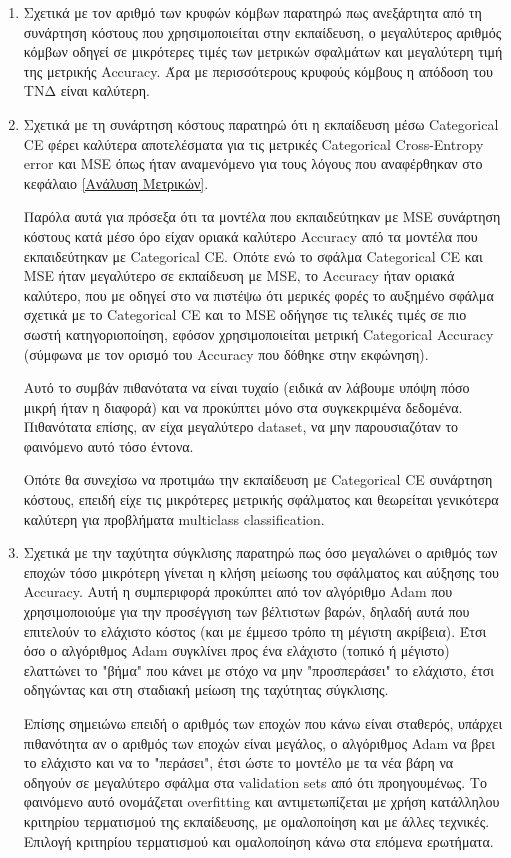 \documentclass[12pt,a4paper]{article}
\begin{document}
\begin{enumerate}
    \item Σχετικά με τον αριθμό των κρυφών κόμβων παρατηρώ πως ανεξάρτητα από τη συνάρτηση κόστους που χρησιμοποιείται στην εκπαίδευση, ο μεγαλύτερος αριθμός κόμβων οδηγεί σε μικρότερες τιμές των μετρικών σφαλμάτων και μεγαλύτερη τιμή της μετρικής Accuracy. Άρα με περισσότερους κρυφούς κόμβους η απόδοση του ΤΝΔ είναι καλύτερη.
    \item Σχετικά με τη συνάρτηση κόστους παρατηρώ ότι η εκπαίδευση μέσω Categorical CE φέρει καλύτερα αποτελέσματα για τις μετρικές Categorical Cross-Entropy error και MSE όπως ήταν αναμενόμενο για τους λόγους που αναφέρθηκαν στο κεφάλαιο \ref{Ανάλυση Μετρικών}. 

        Παρόλα αυτά για πρόσεξα ότι τα μοντέλα που εκπαιδεύτηκαν με MSE συνάρτηση κόστους κατά μέσο όρο είχαν οριακά καλύτερο Accuracy από τα μοντέλα που εκπαιδεύτηκαν με Categorical CE. Οπότε ενώ το σφάλμα Categorical CE και MSE ήταν μεγαλύτερο σε εκπαίδευση με MSE, το Accuracy ήταν οριακά καλύτερο, που με οδηγεί στο να πιστέψω ότι μερικές φορές το αυξημένο σφάλμα σχετικά με το Categorical CE και το MSE οδήγησε τις τελικές τιμές σε πιο σωστή κατηγοριοποίηση, εφόσον χρησιμοποιείται μετρική Categorical Accuracy (σύμφωνα με τον ορισμό του Accuracy που δόθηκε στην εκφώνηση). 

        Αυτό το συμβάν πιθανότατα να είναι τυχαίο (ειδικά αν λάβουμε υπόψη πόσο μικρή ήταν η διαφορά) και να προκύπτει μόνο στα συγκεκριμένα δεδομένα. Πιθανότατα επίσης, αν είχα μεγαλύτερο dataset, να μην παρουσιαζόταν το φαινόμενο αυτό τόσο έντονα.

        Οπότε θα συνεχίσω να προτιμάω την εκπαίδευση με Categorical CE συνάρτηση κόστους, επειδή είχε τις μικρότερες μετρικής σφάλματος και θεωρείται γενικότερα καλύτερη για προβλήματα multiclass classification.
    \item Σχετικά με την ταχύτητα σύγκλισης παρατηρώ πως όσο μεγαλώνει ο αριθμός των εποχών τόσο μικρότερη γίνεται η κλήση μείωσης του σφάλματος και αύξησης του Accuracy. Αυτή η συμπεριφορά προκύπτει από τον αλγόριθμο Adam που χρησιμοποιούμε για την προσέγγιση των βέλτιστων βαρών, δηλαδή αυτά που επιτελούν το ελάχιστο κόστος (και με έμμεσο τρόπο τη μέγιστη ακρίβεια). Έτσι όσο ο αλγόριθμος Adam συγκλίνει προς ένα ελάχιστο (τοπικό ή μέγιστο) ελαττώνει το "βήμα" που κάνει με στόχο να μην "προσπεράσει" το ελάχιστο, έτσι οδηγώντας και στη σταδιακή μείωση της ταχύτητας σύγκλισης.

        Επίσης σημειώνω επειδή ο αριθμός των εποχών που κάνω είναι σταθερός, υπάρχει πιθανότητα αν ο αριθμός των εποχών είναι μεγάλος, ο αλγόριθμος Adam να βρει το ελάχιστο και να το "περάσει", έτσι ώστε το μοντέλο με τα νέα βάρη να οδηγούν σε μεγαλύτερο σφάλμα στα validation sets από ότι προηγουμένως. Το φαινόμενο αυτό ονομάζεται overfitting και αντιμετωπίζεται με χρήση κατάλληλου κριτηρίου τερματισμού της εκπαίδευσης, με ομαλοποίηση και με άλλες τεχνικές. Επιλογή κριτηρίου τερματισμού και ομαλοποίηση κάνω στα επόμενα ερωτήματα.
        
\end{enumerate}
\end{document}
